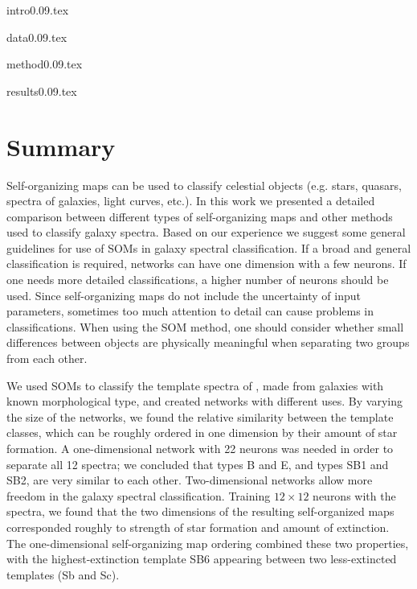 \documentclass[useAMS,usenatbib]{mn2e}
\begin{document}
{intro0.09.tex}

{data0.09.tex}

{method0.09.tex}

{results0.09.tex}


\section{Summary}
\label{sec: summary_SOMZ}

    Self-organizing maps can be used to classify celestial objects (e.g. stars, quasars, spectra of galaxies, light curves, etc.).
    In this work we presented a detailed comparison between different types of self-organizing maps and other methods used to classify galaxy spectra.
    Based on our experience we suggest some general guidelines for use of SOMs in galaxy spectral classification.
    If a broad and general classification is required, networks can have one dimension with a few neurons. 
    If one needs more detailed classifications, a higher number of neurons should be used.
    Since self-organizing maps do not include the uncertainty of input parameters, sometimes too much attention to detail can cause problems in classifications. 
    When using the SOM method, one should consider whether small differences between objects are physically meaningful when separating two groups from each other.

    We used SOMs to classify the template spectra of , made from galaxies with known morphological type, and created networks with different uses.
    By varying the size of the networks, we found the relative similarity between the  template classes, which can be roughly ordered in one dimension by their amount of star formation.
     A one-dimensional network with 22 neurons was needed in order to
    separate all 12  spectra; we concluded that  types B and E, and types SB1 and SB2, are very similar to each other.
    Two-dimensional networks allow more freedom in the galaxy spectral classification.
    Training $12\times 12$ neurons with the  spectra, we found that the two dimensions of the resulting self-organized maps corresponded roughly to strength of star formation and amount of extinction. The one-dimensional self-organizing map ordering combined these two properties, with the highest-extinction template SB6 appearing between two less-extincted templates (Sb and Sc).
    
\end{document}
